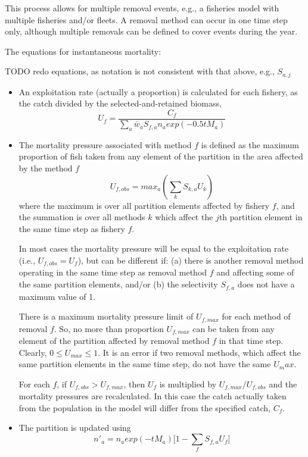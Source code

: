 This process allows for multiple removal events, e.g., a fisheries model with multiple fisheries and/or fleets. A removal method can occur in one time step only, although multiple removals can be defined to cover events during the year.

The equations for instantaneous mortality:

TODO redo equations, as notation is not consistent with that above, e.g., $S_{a,j}$

\begin{itemize}
	\item An exploitation rate (actually a proportion) is calculated for each fishery, as the catch divided by the selected-and-retained biomass,
	$$ U_f = \frac{C_f}{\sum_a \bar{w}_a S_{f,a} n_a exp(-0.5 t M_a)}$$
	\item The mortality pressure associated with method $f$ is defined as the maximum proportion of fish taken from any element of the partition in the area affected by the method $f$
	$$ U_{f,obs} = max_a(\sum_k S_{k,a} U_k) $$
	where the maximum is over all partition elements affected by fishery $f$, and the summation is over all methods $k$ which affect the $j$th partition element in the same time step as fishery $f$.

	In most cases the mortality pressure will be equal to the exploitation rate (i.e., $U_{f,obs} = U_f$), but can be different if: (a) there is another removal method operating in the same time step as removal method $f$ and affecting some of the same partition elements, and/or (b) the selectivity $S_{f,a}$ does not have a maximum value of 1.

	There is a maximum mortality pressure limit of $U_{f,max}$ for each method of removal $f$. So, no more than proportion $U_{f,max}$ can be taken from any element of the partition affected by removal method $f$ in that time step. Clearly, $0 \leq U_{max} \leq 1$. It is an error if two removal methods, which affect the same partition elements in the same time step, do not have the same $U_max$.

	For each $f$, if $U_{f,obs} > U_{f,max}$, then $U_f$ is multiplied by $U_{f,max}/U_{f,obs}$ and the mortality pressures are recalculated. In this case the catch actually taken from the population in the model will differ from the specified catch, $C_f$.

	\item The partition is updated using
		$$ n'_a = n_a exp(-tM_a)\big[1 - \sum_f S_{f,a} U_f \big] $$
\end{itemize}

